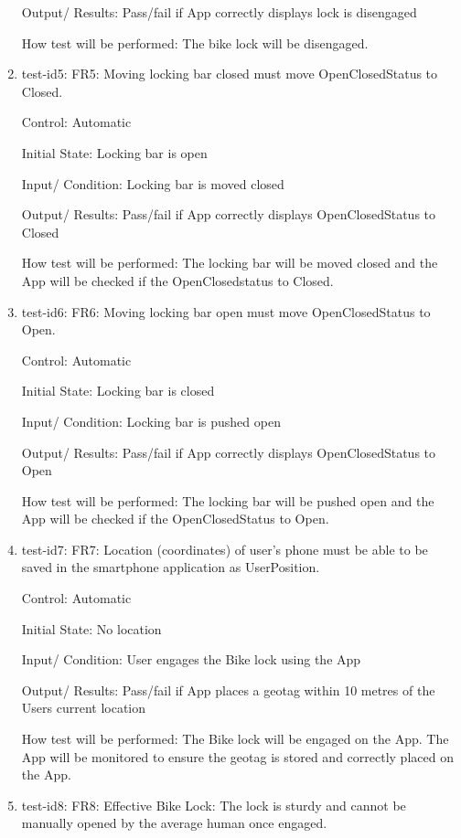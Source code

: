 \documentclass[12pt, titlepage]{article}
\begin{document}
\begin{enumerate}
Output/ Results: Pass/fail if App correctly displays lock is disengaged 

How test will be performed: The bike lock will be disengaged. 

\item{test-id5: FR5: Moving locking bar closed must move OpenClosedStatus to Closed. \\} 

Control: Automatic 

Initial State: Locking bar is open 

Input/ Condition: Locking bar is moved closed 

Output/ Results: Pass/fail if App correctly displays OpenClosedStatus to Closed 

How test will be performed: The locking bar will be moved closed and the App will be checked if the OpenClosedstatus to Closed. 

\item{test-id6: FR6: Moving locking bar open must move OpenClosedStatus to Open. \\} 

Control: Automatic 

Initial State: Locking bar is closed 

Input/ Condition: Locking bar is pushed open 

Output/ Results: Pass/fail if App correctly displays OpenClosedStatus to Open 

How test will be performed: The locking bar will be pushed open and the App will be checked if the OpenClosedStatus to Open. 
 
\item{test-id7: FR7: Location (coordinates) of user’s phone must be able to be saved in the smartphone application as UserPosition. \\} 

Control: Automatic 

Initial State: No location  

Input/ Condition: User engages the Bike lock using the App 

Output/ Results: Pass/fail if App places a geotag within 10 metres of the Users current location 

How test will be performed: The Bike lock will be engaged on the App. The App will be monitored to ensure the geotag is stored and correctly placed on the App.  

\item{test-id8: FR8: Effective Bike Lock: The lock is sturdy and cannot be manually opened by the average human once engaged. \\}


\end{enumerate}
\end{document}
